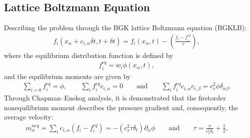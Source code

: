 \documentclass[letterpaper,10pt,english,openany,oneside]{jupyterBook}
\begin{document}
\subsection{Lattice Boltzmann Equation}
\label{\detokenize{LBM-Study/Diffusive-Equation:lattice-boltzmann-equation}}
\sphinxAtStartPar
Describing the problem through the BGK lattice Boltzmann equation (BGK\sphinxhyphen{}LB):
\begin{equation}\label{equation:LBM-Study/Diffusive-Equation:LB-df-Eq}
\begin{split}
f_i( x_{\alpha} + c_{i,\alpha} \delta t, t+\delta t) = f_i(x_{\alpha}, t)  -\left( \frac{ f_{i} - f_{i}^{eq} }{ \tau } \right), 
\end{split}
\end{equation}
\sphinxAtStartPar
where the equilibrium distribution function is defined by
\begin{equation*}
\begin{split}
f^{eq}_{i} = w_{i}\phi(x_{\alpha}, t),
\end{split}
\end{equation*}
\sphinxAtStartPar
and the equilibrium moments are given by
\begin{equation}\label{equation:LBM-Study/Diffusive-Equation:moments-fi-df}
\begin{split}
\displaystyle\sum_{i=0} f_{i}^{eq}=\phi, \quad \quad  \displaystyle\sum_{i}f_{i}^{eq} c_{i,\alpha} =0 \quad \quad \textrm{and} \quad \quad  \displaystyle\sum_{i}f_{i}^{eq} c_{i,\alpha} c_{i,\beta} =c_{s}^{2} \phi \delta_{\alpha\beta}.
\end{split}
\end{equation}
\sphinxAtStartPar
Through Chapman–Enskog analysis, it is demonstrated that the first\sphinxhyphen{}order non\sphinxhyphen{}equilibrium moment describes the pressure gradient and, consequently, the average velocity:
\begin{equation*}
\begin{split}
m^{neq}_{\alpha} = \displaystyle\sum_{i} c_{i,\alpha}\left( f_i-f_i^{eq}\right)  = -(c_{s}^{2} \tau \delta_{t})\partial_{\alpha}\phi  \quad \quad \textrm{and} \quad\quad \tau = \displaystyle\frac{\nu}{c_{s}^{2} \delta_{t}} +\frac{1}{2}.
\end{split}
\end{equation*}
\end{document}
